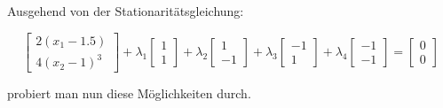 \documentclass[a4paper, 12pt]{report}
\begin{document}
Ausgehend von der Stationaritätsgleichung:

$$ \begin{bmatrix}2(x_1 - 1.5)\\4(x_2 - 1)^3\end{bmatrix} + \lambda_1 \begin{bmatrix}1\\1\end{bmatrix} + \lambda_2 \begin{bmatrix}1\\-1\end{bmatrix} + \lambda_3 \begin{bmatrix}-1\\1\end{bmatrix} + \lambda_4 \begin{bmatrix}-1\\-1\end{bmatrix} = \begin{bmatrix}0\\0\end{bmatrix}$$

probiert man nun diese Möglichkeiten durch.
\end{document}
